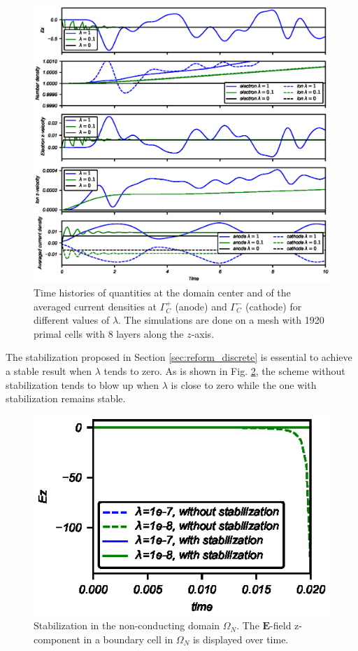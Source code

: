 \documentclass{article}
\begin{document}
\begin{figure}
    \centering
    \includegraphics[scale=0.9]{data-vs-time_stepVoltage.eps}
    \caption{Time histories of quantities at the domain center and of the averaged current densities at $\Gamma^+_C$ (anode) and $\Gamma^-_C$ (cathode) for different values of $\lambda$. The simulations are done on a mesh with 1920 primal cells with 8 layers along the $z$-axis.}
    \label{fig:origin-data_vs_time}
\end{figure}

The stabilization proposed in Section \ref{sec:reform_discrete} is essential to achieve a stable result when $\lambda$ tends to zero. As is shown in Fig. \ref{fig:stabilization_comparison}, the scheme without stabilization tends to blow up when $\lambda$ is close to zero while the one with stabilization remains stable. 
\begin{figure}
    \centering
    \includegraphics{stabilizationComparision_stepVoltage.eps}
    \caption{Stabilization in the non-conducting domain $\Omega_N$. The $\mathbf{E}$-field z-component in a boundary cell in $\Omega_N$ is displayed over time. }
    \label{fig:stabilization_comparison}
\end{figure}
\end{document}
